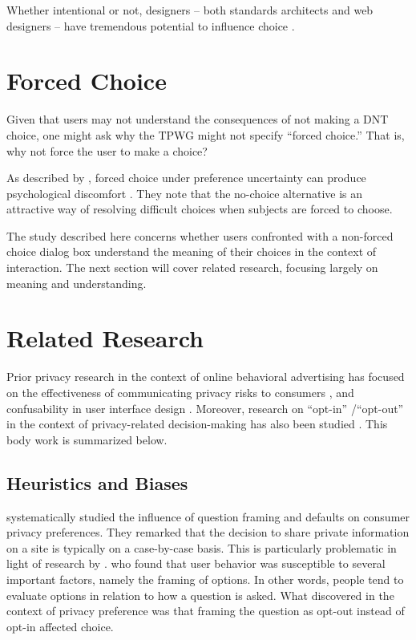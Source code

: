 Whether intentional or not, designers -- both standards architects and web designers -- have tremendous potential to influence choice  \citep{Thaler:2010uy}.  

\section{Forced Choice}
\label{forcedchoice}

Given that users may not understand the consequences of not making a DNT choice, one might ask why the TPWG might not specify ``forced choice.'' That is, why not force the user to make a choice? 

As described by  \citet{Dhar:2003vb},  forced choice under preference uncertainty can produce psychological discomfort  \citep[referencing work by][]{Festinger:1964ub,Lewin:1951uj,Janis:1977vx}.  They note that the no-choice alternative is an attractive way of resolving difficult choices when subjects are forced to choose. 

The study described here concerns whether users confronted with a non-forced choice dialog box understand the meaning of their choices in the context of interaction. The next section will cover related research, focusing largely on meaning and understanding.

\section{Related Research}
\label{relatedresearch}

Prior privacy research in the context of online behavioral advertising has focused on the effectiveness of communicating privacy risks to consumers  \citep{McDonald:2009td},  and confusability in user interface design  \citep{Leon:2012vu}.  Moreover, research on ``opt-in'' \slash  ``opt-out'' in the context of privacy-related decision-making has also been studied  \citep{Bellman:2001vq,Lai:2006ws}.  This body work is summarized below.

\subsection{Heuristics and Biases}
\label{heuristicsandbiases}

 \citet{Bellman:2001vq}  systematically studied the influence of question framing and defaults on consumer privacy preferences. They remarked that the decision to share private information on a site is typically on a case-by-case basis. This is particularly problematic in light of research by  \citep{Kahneman:1984td}.  who found that user behavior was susceptible to several important factors, namely the framing of options. In other words, people tend to evaluate options in relation to how a question is asked. What  \citeauthor{Bellman:2001vq}  discovered in the context of privacy preference was that framing the question as opt-out instead of opt-in affected choice. 

